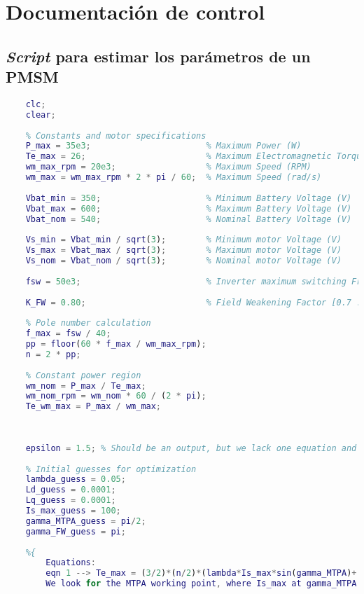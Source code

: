 \chapter{Documentación de control}
\section{\textit{Script} para estimar los parámetros de un PMSM}
\begin{lstlisting}[language=Matlab, basicstyle=\ttfamily\small, breaklines=true, frame=single]
	% Clear workspace and command window
	clc;
	clear;
	
	% Constants and motor specifications
	P_max = 35e3;                       % Maximum Power (W)
	Te_max = 26;                        % Maximum Electromagnetic Torque (Nm)
	wm_max_rpm = 20e3;                  % Maximum Speed (RPM)
	wm_max = wm_max_rpm * 2 * pi / 60;  % Maximum Speed (rad/s)
	
	Vbat_min = 350;                     % Minimum Battery Voltage (V)
	Vbat_max = 600;                     % Maximum Battery Voltage (V)
	Vbat_nom = 540;                     % Nominal Battery Voltage (V)
	
	Vs_min = Vbat_min / sqrt(3);        % Minimum motor Voltage (V)
	Vs_max = Vbat_max / sqrt(3);        % Maximum motor Voltage (V)
	Vs_nom = Vbat_nom / sqrt(3);        % Nominal motor Voltage (V)
	
	fsw = 50e3;                         % Inverter maximum switching Frequency (Hz)
	
	K_FW = 0.80;                        % Field Weakening Factor [0.7 .. 0.95]
	
	% Pole number calculation
	f_max = fsw / 40;
	pp = floor(60 * f_max / wm_max_rpm);
	n = 2 * pp;
	
	% Constant power region
	wm_nom = P_max / Te_max;
	wm_nom_rpm = wm_nom * 60 / (2 * pi);
	Te_wm_max = P_max / wm_max;
	
	
	
	epsilon = 1.5; % Should be an output, but we lack one equation and we can take similar motors' saliency ratios
	
	% Initial guesses for optimization
	lambda_guess = 0.05;
	Ld_guess = 0.0001;
	Lq_guess = 0.0001;
	Is_max_guess = 100;
	gamma_MTPA_guess = pi/2;
	gamma_FW_guess = pi;
	
	%{
		Equations:
		eqn 1 --> Te_max = (3/2)*(n/2)*(lambda*Is_max*sin(gamma_MTPA)+(Ld-Lq)*Is_max^2*sin(gamma_MTPA)*cos(gamma_MTPA))
		We look for the MTPA working point, where Is_max at gamma_MTPA gives exactly Te_max
		

\end{lstlisting}
